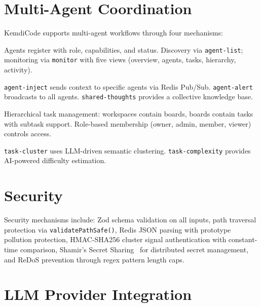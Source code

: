 \documentclass[journal,10pt]{IEEEtran}
\newcommand{\code}[1]{\texttt{#1}}
\begin{document}
\section{Multi-Agent Coordination}
\label{sec:multiagent}

KemdiCode supports multi-agent workflows through four mechanisms:

\begin{description}[nosep,style=unboxed,leftmargin=0pt,font=\normalfont\itshape]
\item[Agent Registry.] Agents register with role, capabilities, and status. Discovery via \code{agent-list}; monitoring via \code{monitor} with five views (overview, agents, tasks, hierarchy, activity).

\item[Message Passing.] \code{agent-inject} sends context to specific agents via Redis Pub/Sub. \code{agent-alert} broadcasts to all agents. \code{shared-thoughts} provides a collective knowledge base.

\item[Kanban System.] Hierarchical task management: workspaces contain boards, boards contain tasks with subtask support. Role-based membership (owner, admin, member, viewer) controls access.

\item[Task Intelligence.] \code{task-cluster} uses LLM-driven semantic clustering. \code{task-complexity} provides AI-powered difficulty estimation.
\end{description}

\section{Security}
\label{sec:security}

Security mechanisms include: Zod schema validation on all inputs, path traversal protection via \code{validatePathSafe()}, Redis JSON parsing with prototype pollution protection, HMAC-SHA256 cluster signal authentication with constant-time comparison, Shamir's Secret Sharing~\cite{shamir1979} for distributed secret management, and ReDoS prevention through regex pattern length caps.

\section{LLM Provider Integration}
\label{sec:providers}
\end{document}
